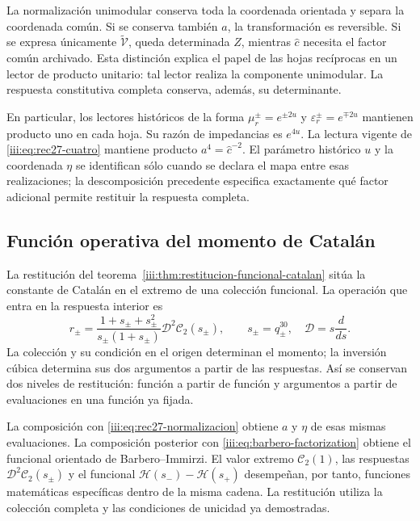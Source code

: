 La normalización unimodular conserva toda la coordenada orientada y
separa la coordenada común. Si se conserva también $a$, la transformación
es reversible. Si se expresa únicamente $\widetilde{\mathcal V}$,
queda determinada $\widehat Z$, mientras $\widehat c$ necesita el
factor común archivado. Esta distinción explica el papel de las hojas
recíprocas en un lector de producto unitario: tal lector realiza la
componente unimodular. La respuesta constitutiva completa conserva,
además, su determinante.

En particular, los lectores históricos de la forma
$\mu_r^\pm=e^{\pm2u}$ y $\varepsilon_r^\pm=e^{\mp2u}$
mantienen producto uno en cada hoja. Su razón de impedancias es
$e^{4u}$. La lectura vigente de \eqref{iii:eq:rec27-cuatro}
mantiene producto $a^4=\widehat c^{-2}$. El parámetro histórico $u$
y la coordenada $\eta$ se identifican sólo cuando se declara el mapa
entre esas realizaciones; la descomposición precedente especifica
exactamente qué factor adicional permite restituir la respuesta completa.

\subsection{Función operativa del momento de Catalán}

La restitución del teorema~\ref{iii:thm:restitucion-funcional-catalan}
sitúa la constante de Catalán en el extremo de una colección funcional.
La operación que entra en la respuesta interior es
\begin{equation}
 r_\pm=
 \frac{1+s_\pm+s_\pm^2}{s_\pm(1+s_\pm)}
 \mathcal D^2\mathcal C_2(s_\pm),\qquad
 s_\pm=q_\pm^{30},\quad \mathcal D=s\frac{d}{ds}.
 \label{iii:eq:rec27-catalan-operativo}
\end{equation}
La colección y su condición en el origen determinan el momento; la
inversión cúbica determina sus dos argumentos a partir de las respuestas.
Así se conservan dos niveles de restitución: función a partir de función
y argumentos a partir de evaluaciones en una función ya fijada.

La composición con \eqref{iii:eq:rec27-normalizacion} obtiene $a$ y
$\eta$ de esas mismas evaluaciones. La composición posterior con
\eqref{iii:eq:barbero-factorization} obtiene el funcional orientado
de Barbero--Immirzi. El valor extremo $\mathcal C_2(1)$,
las respuestas $\mathcal D^2\mathcal C_2(s_\pm)$ y el funcional
$\mathcal H(s_-)-\mathcal H(s_+)$ desempeñan, por tanto, funciones
matemáticas específicas dentro de la misma cadena. La restitución utiliza
la colección completa y las condiciones de unicidad ya demostradas.

